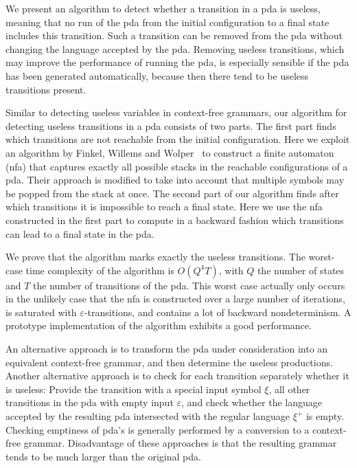 \documentclass{llncs}
\newcommand{\eps}{\ensuremath{\varepsilon}}
\begin{document}
We present an algorithm to detect whether a transition in a pda is useless,
meaning that no run of the pda from the initial configuration to a final state
includes this transition. Such a transition can be removed from the pda without
changing the language accepted by the pda. Removing useless transitions, which
may improve the performance of running the pda, is especially sensible if
the pda has been generated automatically, because then there tend to be useless
transitions present.

Similar to detecting useless variables in context-free grammars,
our algorithm for detecting useless transitions in a pda consists of
two parts. The first part finds which transitions are not reachable from
the initial configuration.
Here we exploit an algorithm by Finkel, Willems and Wolper~\cite{FinkelWW97}
to construct a finite automaton (nfa) that captures exactly all
possible stacks in the reachable configurations of a pda.
Their approach is modified to take into account that multiple symbols may be popped from
the stack at once. The second part of our algorithm finds after which transitions
it is impossible to reach a final state.  Here we use the nfa
constructed in the first part to compute in a backward fashion which transitions
can lead to a final state in the pda.

We prove that the algorithm marks exactly the useless transitions.
The worst-case time complexity of the algorithm is $O(Q^4T)$, with
$Q$ the number of states and $T$ the number of transitions of the pda.
This worst case actually only occurs in the unlikely case that the nfa
is constructed over a large number of iterations, is saturated with
$\eps$-transitions, and contains a lot of backward nondeterminism.
A prototype implementation of the algorithm exhibits a good performance.


An alternative approach is to transform the pda under consideration into an equivalent
context-free grammar, and then determine the useless productions.
Another alternative approach is to check for each transition separately whether it is useless:
Provide the transition with a special input symbol $\xi$, all other transitions in the pda
with empty input $\eps$, and check whether the language accepted by the resulting pda intersected
with the regular language $\xi^+$ is empty. Checking emptiness of pda's is generally
performed by a conversion to a context-free grammar.
Disadvantage of these approaches is that the resulting grammar tends to be much larger than the original pda.
\end{document}
